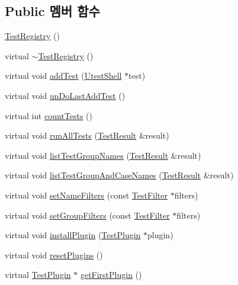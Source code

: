 \subsection*{Public 멤버 함수}
\begin{DoxyCompactItemize}
\item 
\hyperlink{class_test_registry_a1c5df36acee3c5b49f5796e3d25d116b}{Test\+Registry} ()
\item 
virtual \hyperlink{class_test_registry_ae58097d6ab46b801cf270c6284620d04}{$\sim$\+Test\+Registry} ()
\item 
virtual void \hyperlink{class_test_registry_a5355d3dbb7e07dbb9370a30424b243dc}{add\+Test} (\hyperlink{class_utest_shell}{Utest\+Shell} $\ast$test)
\item 
virtual void \hyperlink{class_test_registry_ac2a1c4ff626d3a17ce2770d730fb6764}{un\+Do\+Last\+Add\+Test} ()
\item 
virtual int \hyperlink{class_test_registry_aabfe7889f5907ce121416805431c4866}{count\+Tests} ()
\item 
virtual void \hyperlink{class_test_registry_a881163eeadeeab81d09963bec459b437}{run\+All\+Tests} (\hyperlink{class_test_result}{Test\+Result} \&result)
\item 
virtual void \hyperlink{class_test_registry_a614f92444318767c4f87367a16decb7b}{list\+Test\+Group\+Names} (\hyperlink{class_test_result}{Test\+Result} \&result)
\item 
virtual void \hyperlink{class_test_registry_a3e4f592627c3d0d5dc10ceba9a4f370d}{list\+Test\+Group\+And\+Case\+Names} (\hyperlink{class_test_result}{Test\+Result} \&result)
\item 
virtual void \hyperlink{class_test_registry_a96d94b820951ab7750326e1d888a32dc}{set\+Name\+Filters} (const \hyperlink{class_test_filter}{Test\+Filter} $\ast$filters)
\item 
virtual void \hyperlink{class_test_registry_aa709d6c4bd37c1773bd43234307dbec8}{set\+Group\+Filters} (const \hyperlink{class_test_filter}{Test\+Filter} $\ast$filters)
\item 
virtual void \hyperlink{class_test_registry_a684fd0406cfc48f83f2bcedf07e16f3c}{install\+Plugin} (\hyperlink{class_test_plugin}{Test\+Plugin} $\ast$plugin)
\item 
virtual void \hyperlink{class_test_registry_ac29ea1d98d56e0bb7904297e4571b60c}{reset\+Plugins} ()
\item 
virtual \hyperlink{class_test_plugin}{Test\+Plugin} $\ast$ \hyperlink{class_test_registry_a46d609f3c460d2ec3d84b48f2ec26d56}{get\+First\+Plugin} ()

\end{DoxyCompactItemize}
